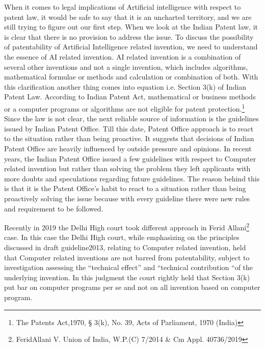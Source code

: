 \begin{multicols}{2}

\vspace{.1cm}

\noi
When it comes to legal implications of Artificial intelligence with respect to patent law, it
would be safe to say that it is an uncharted territory, and we are still trying to figure out our
first step. When we look at the Indian Patent law, it is clear that there is no provision to
address the issue. To discuss the possibility of patentability of Artificial Intelligence related
invention, we need to understand the essence of AI related invention. AI related invention is
a combination of several other inventions and not a single invention, which includes
algorithms, mathematical formulae or methods and calculation or combination of both. With
this clarification another thing comes into equation i.e. Section 3(k) of Indian Patent Law.
According to Indian Patent Act, mathematical or business methods or a computer programs
or algorithms are not eligible for patent protection.\footnote{The Patents Act,1970, § 3(k), No. 39, Acts of Parliament, 1970 (India)}
Since the law is not clear, the next
reliable source of information is the guidelines issued by Indian Patent Office. Till this date,
Patent Office approach is to react to the situation rather than being proactive. It suggests that
decisions of Indian Patent Office are heavily influenced by outside pressure and opinions. In recent years, the Indian Patent Office issued a few guidelines with respect to Computer
related invention but rather than solving the problem they left applicants with more doubts
and speculations regarding future guidelines. The reason behind this is that it is the Patent
Office’s habit to react to a situation rather than being proactively solving the issue because
with every guideline there were new rules and requirement to be followed. 

\noi
Recently in 2019 the Delhi High court took different approach in Ferid Allani\footnote{FeridAllani V. Union of India, W.P.(C) 7/2014 \& Cm Appl. 40736/2019}
 case. In this
case the Delhi High court, while emphasizing on the principles discussed in draft guideline2013, relating to Computer related invention, held that Computer related inventions are not
barred from patentability, subject to investigation assessing the “technical effect” and
“technical contribution “of the underlying invention. In this judgment the court rightly held
that Section 3(k) put bar on computer programs per se and not on all invention based on
computer program. 


\end{multicols}
